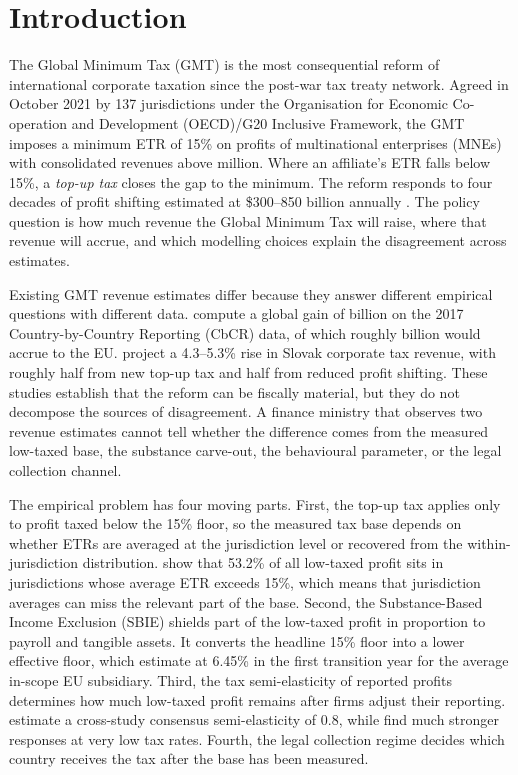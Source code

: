 \documentclass[11pt,a4paper]{article}
\newcommand{\EUR}{\texteuro}
\begin{document}
\newpage

\section{Introduction}\label{sec:introduction}

The Global Minimum Tax (GMT) is the most consequential reform of international corporate taxation since the post-war tax treaty network. Agreed in October 2021 by 137 jurisdictions under the Organisation for Economic Co-operation and Development (OECD)/G20 Inclusive Framework, the GMT imposes a minimum ETR of 15\% on profits of multinational enterprises (MNEs) with consolidated revenues above \EUR750 million. Where an affiliate's ETR falls below 15\%, a \emph{top-up tax} closes the gap to the minimum. The reform responds to four decades of profit shifting estimated at \$300--850 billion annually \citep{torslov2023,garcia-bernardo2024,blouin2023,cobham2018}. The policy question is how much revenue the Global Minimum Tax will raise, where that revenue will accrue, and which modelling choices explain the disagreement across estimates.

Existing GMT revenue estimates differ because they answer different empirical questions with different data. \citet{barake2022} compute a global gain of \EUR179 billion on the 2017 Country-by-Country Reporting (CbCR) data, of which roughly \EUR55 billion would accrue to the EU. \citet{boukal2026} project a 4.3--5.3\% rise in Slovak corporate tax revenue, with roughly half from new top-up tax and half from reduced profit shifting. These studies establish that the reform can be fiscally material, but they do not decompose the sources of disagreement. A finance ministry that observes two revenue estimates cannot tell whether the difference comes from the measured low-taxed base, the substance carve-out, the behavioural parameter, or the legal collection channel.

The empirical problem has four moving parts. First, the top-up tax applies only to profit taxed below the 15\% floor, so the measured tax base depends on whether ETRs are averaged at the jurisdiction level or recovered from the within-jurisdiction distribution. \citet{hugger2026} show that 53.2\% of all low-taxed profit sits in jurisdictions whose average ETR exceeds 15\%, which means that jurisdiction averages can miss the relevant part of the base. Second, the Substance-Based Income Exclusion (SBIE) shields part of the low-taxed profit in proportion to payroll and tangible assets. It converts the headline 15\% floor into a lower effective floor, which \citet{devereux2023} estimate at 6.45\% in the first transition year for the average in-scope EU subsidiary. Third, the tax semi-elasticity of reported profits determines how much low-taxed profit remains after firms adjust their reporting. \citet{heckemeyer2017} estimate a cross-study consensus semi-elasticity of 0.8, while \citet{dowd2017} find much stronger responses at very low tax rates. Fourth, the legal collection regime decides which country receives the tax after the base has been measured.
\end{document}
